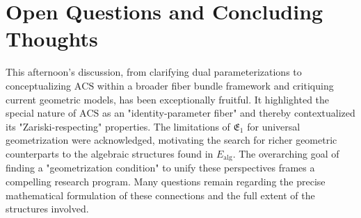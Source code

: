 \documentclass{article}[a4paper,12pt]
\begin{document}
\section{Open Questions and Concluding Thoughts}
This afternoon's discussion, from clarifying dual parameterizations to conceptualizing $\mathrm{ACS}$ within a broader fiber bundle framework and critiquing current geometric models, has been exceptionally fruitful. It highlighted the special nature of $\mathrm{ACS}$ as an "identity-parameter fiber" and thereby contextualized its "Zariski-respecting" properties. The limitations of $\mathfrak{E}_1$ for universal geometrization were acknowledged, motivating the search for richer geometric counterparts to the algebraic structures found in $E_{\text{alg}}$. The overarching goal of finding a "geometrization condition" to unify these perspectives frames a compelling research program. Many questions remain regarding the precise mathematical formulation of these connections and the full extent of the structures involved.
\end{document}
